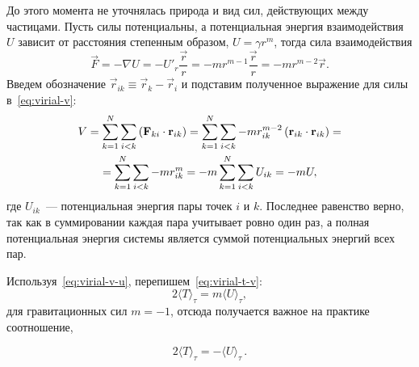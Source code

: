 До этого момента не уточнялась природа и вид сил, действующих между частицами. Пусть силы потенциальны, а потенциальная энергия взаимодействия~$U$ зависит от расстояния степенным образом, $U = \gamma r^m$, тогда сила взаимодействия 
\begin{equation*}
    \vec F = -\nabla U = - U'_r \frac{\vec{r}}{r} = -mr^{m - 1} \frac{\vec{r}}{r} = -m r^{m - 2} \vec r.
\end{equation*}
Введем обозначение $\vec r_{ik} \equiv \vec r_k - \vec r_i$ и подставим полученное выражение для силы в~\eqref{eq:virial-v}:
\begin{multline}
    V 
    = \sum_{k = 1}^N \sum_{i < k} \left(\mathbf{F}_{ki} \cdot \mathbf{r}_{ik} \right)
    = \sum_{k = 1}^N \sum_{i < k} -m r_{ik}^{m - 2} \left(\mathbf{r}_{ik} \cdot \mathbf{r}_{ik} \right) = \\
    = \sum_{k = 1}^N \sum_{i < k} -m r_{ik}^{m}
    = -m \sum_{k = 1}^N \sum_{i < k} U_{ik} = -mU,
    \label{eq:virial-v-u}
\end{multline}
где $U_{ik}$~--- потенциальная энергия пары точек $i$ и $k$. Последнее равенство верно, так как в суммировании каждая пара учитывает ровно один раз, а полная потенциальная энергия системы является суммой потенциальных энергий всех пар.

Используя~\eqref{eq:virial-v-u}, перепишем~\eqref{eq:virial-t-v}: 
\begin{equation*}
    2 \langle T \rangle_\tau = m \langle U \rangle_\tau,
\end{equation*} 
для гравитационных сил $m = -1$, отсюда получается важное на практике соотношение, 

\begin{equation}
    \boxed{2\langle T \rangle_\tau = -\langle U \rangle_\tau\!}\,.
\end{equation}

